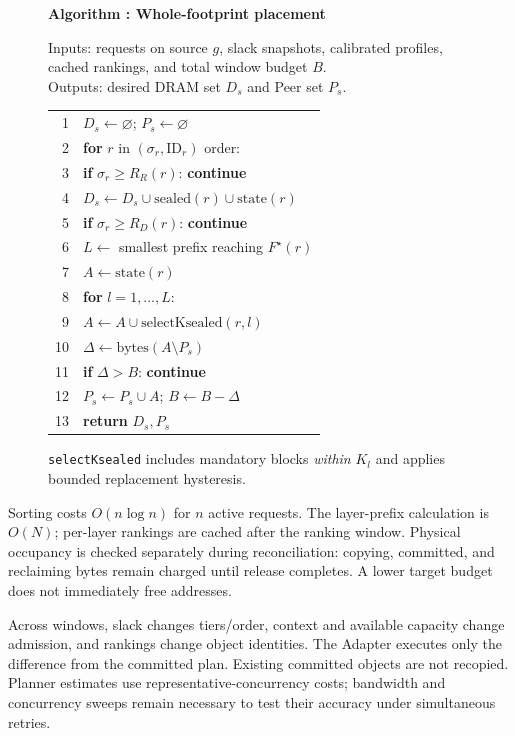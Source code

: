 \begin{figure}[t]
  \label{alg:placement}
  \noindent\textbf{Algorithm \thedesignalgorithm: Whole-footprint placement}
  \par\smallskip
  \noindent Inputs: requests on source $g$, slack snapshots, calibrated
  profiles, cached rankings, and total window budget $B$.\\
  Outputs: desired DRAM set $D_s$ and Peer set $P_s$.
  \par\smallskip
  \begin{tabularx}{\columnwidth}{@{}r@{\quad}X@{}}
    \toprule
    1 & $D_s\gets\varnothing$; $P_s\gets\varnothing$ \\
    2 & \textbf{for} $r$ in $(\sigma_r,\mathrm{ID}_r)$ order: \\
    3 & \quad\textbf{if} $\sigma_r\ge R_R(r)$: \textbf{continue} \\
    4 & \quad$D_s\gets D_s\cup\mathrm{sealed}(r)\cup\mathrm{state}(r)$ \\
    5 & \quad\textbf{if} $\sigma_r\ge R_D(r)$: \textbf{continue} \\
    6 & \quad$L\gets$ smallest prefix reaching $F^\star(r)$ \\
    7 & \quad$A\gets\mathrm{state}(r)$ \\
    8 & \quad\textbf{for} $l=1,\ldots,L$: \\
    9 & \qquad$A\gets A\cup\mathrm{selectKsealed}(r,l)$ \\
   10 & \quad$\Delta\gets\mathrm{bytes}(A\setminus P_s)$ \\
   11 & \quad\textbf{if} $\Delta>B$: \textbf{continue} \\
   12 & \quad$P_s\gets P_s\cup A$; $B\gets B-\Delta$ \\
   13 & \textbf{return} $D_s,P_s$ \\
    \bottomrule
  \end{tabularx}
  \par\smallskip
  \noindent\texttt{selectKsealed} includes mandatory blocks \emph{within}
  $K_l$ and applies bounded replacement hysteresis.
\end{figure}

Sorting costs $O(n\log n)$ for $n$ active requests. The layer-prefix
calculation is $O(N)$; per-layer rankings are cached after the ranking
window. Physical occupancy is checked separately during reconciliation:
copying, committed, and reclaiming bytes remain charged until release
completes. A lower target budget does not immediately free addresses.

Across windows, slack changes tiers/order, context and available capacity
change admission, and rankings change object identities. The Adapter
executes only the difference from the committed plan. Existing committed
objects are not recopied. Planner estimates use representative-concurrency
costs; bandwidth and concurrency sweeps remain necessary to test their
accuracy under simultaneous retries.
